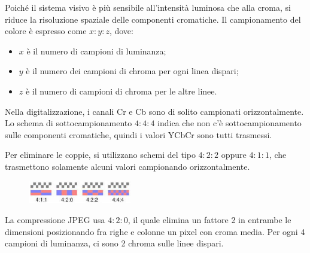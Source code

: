 Poiché il sistema visivo è più sensibile all'intensità luminosa che alla croma, si riduce la risoluzione spaziale delle componenti cromatiche. Il campionamento del colore è espresso come $x : y : z$, dove:
\begin{itemize}
	\item $x$ è il numero di campioni di luminanza;
	\item $y$ è il numero dei campioni di chroma per ogni linea dispari;
	\item $z$ è il numero di campioni di chroma per le altre linee.
\end{itemize}

Nella digitalizzazione, i canali Cr e Cb sono di solito campionati orizzontalmente. Lo schema di sottocampionamento $4 : 4 : 4$ indica che non c'è sottocampionamento sulle componenti cromatiche, quindi i valori YCbCr sono tutti trasmessi. 

Per eliminare le coppie, si utilizzano schemi del tipo $4 : 2 : 2$ oppure $4 : 1 : 1$, che trasmettono solamente alcuni valori campionando orizzontalmente. 

 \begin{figure}
	\vspace{-20pt}
	\includegraphics[width=0.4\textwidth]{Lezioni/Immagini/pixel}
	\vspace{-20pt}
\end{figure}

La compressione JPEG usa $4 : 2 : 0$, il quale elimina un fattore 2 in entrambe le dimensioni posizionando fra righe e colonne un pixel con croma media. Per ogni 4 campioni di luminanza, ci sono 2 chroma sulle linee dispari. 
